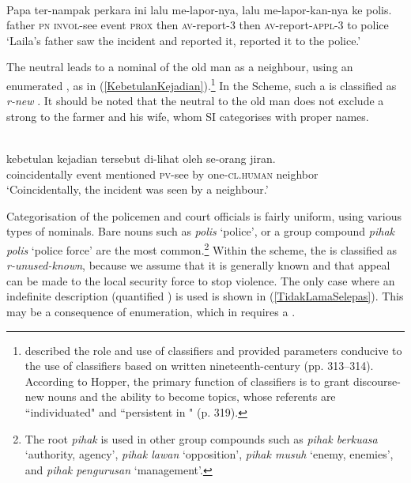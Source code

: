\documentclass[output=paper
,modfonts
,nonflat]{langsci/langscibook}
\begin{document}
\ea\label{PapaLailaMelaporkan} 
\\
	\gll  {\ob}Papa          ter-nampak perkara ini  lalu me-lapor-nya,     lalu me-lapor-kan-nya      ke   polis.\\
	father \textsc{pn} \textsc{invol-}see       event   \textsc{prox} then \textsc{av-}report-3      then \textsc{av-}report-\textsc{appl}-3      to   police\\
	\glt `Laila's father saw the incident and reported it, reported it to the police.'
\z

\noindent
The neutral  leads to a nominal  of the old man as a neighbour, using an enumerated , as in (\ref{KebetulanKejadian}).\footnote{\cite{Hopper1986} described the role and use of classifiers and provided parameters conducive to the use of classifiers based on written nineteenth-century  (pp. 313--314). According to Hopper, the primary function of classifiers is to grant discourse-new nouns  and the ability to become topics, whose referents are ``individuated" and ``persistent in " (p. 319).} In the  Scheme, such a  is classified as \emph{r-new} \citep[11]{RiesterBaumann2017}. It should be noted that the neutral  to the old man does not exclude a strong  to the farmer and his wife, whom SI categorises with proper names. 

\ea\label{KebetulanKejadian} 
\\
	\gll kebetulan      kejadian tersebut  di-lihat      oleh  {\ob}se-orang    jiran{\cb}.\\
		coincidentally event    mentioned \textsc{pv}-see   by   one-\textsc{cl.human} neighbor\\
\glt `Coincidentally, the incident was seen by a neighbour.'
\z

\noindent
Categorisation of the policemen and court officials is fairly uniform, using various types of nominals. Bare nouns such as \emph{polis} `police', or a group compound \emph{pihak polis} `police force' are the most common.\footnote{The root \emph{pihak} is used in other group compounds such as \emph{pihak berkuasa} `authority, agency', \emph{pihak lawan} `opposition', \emph{pihak musuh} `enemy, enemies', and \emph{pihak pengurusan} `management'.} Within the  scheme, the  is classified as \emph{r-unused-known}, because we assume that it is generally known and that appeal can be made to the local security force to stop violence. The only case where an indefinite description (quantified ) is used is shown in (\ref{TidakLamaSelepas}). This may be a consequence of enumeration, which in  requires a .
\end{document}
